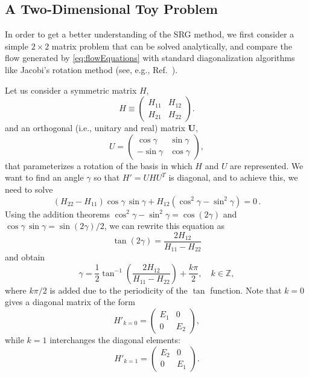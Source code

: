 \subsection{A Two-Dimensional Toy Problem}

In order to get a better understanding of the SRG method, we first consider  
a simple $2\times 2$ matrix problem that can be solved analytically, and 
compare the flow generated by \eqref{eq:flowEquations} with standard 
diagonalization algorithms like Jacobi's rotation method (see, e.g., 
Ref.~\cite{Golub:2013le}).

Let us consider a symmetric matrix $H$, 
\begin{equation} 
  H \equiv \begin{pmatrix} H_{11} & H_{12} \\ H_{21} & H_{22}\end{pmatrix}. 
\end{equation}
and an orthogonal (i.e., unitary and real) matrix $\mathbf{U}$,
\begin{equation}
  U = \begin{pmatrix} \cos\gamma & \sin\gamma \\ -\sin\gamma & \cos\gamma \end{pmatrix}, 
\end{equation}
that parameterizes a rotation of the basis in which $H$ and $U$ are
represented. We want to find an angle $\gamma$ so that $H' = UHU^T$ is diagonal, 
and to achieve this, we need to solve
\begin{equation}
(H_{22} - H_{11})\cos\gamma\,\sin\gamma + H_{12}(\cos^2\gamma - \sin^2\gamma) = 0\,.
\end{equation}
Using the addition theorems $\cos^2\gamma-\sin^2\gamma = \cos(2\gamma)$ and 
$\cos\gamma\,\sin\gamma = \sin(2\gamma)/2$, we can rewrite this equation as
\begin{equation}
  \tan(2\gamma) = \frac{2 H_{12}}{H_{11}-H_{22}}
\end{equation}
and obtain
\begin{equation} 
\gamma = \frac{1}{2} \tan^{-1} \left( \frac{2H_{12}}{H_{11}-H_{22}}
\right) + \frac{k\pi}{2}, \quad k \in \mathbb{Z}, \label{eq:0} 
\end{equation}
where $k\pi/2$ is added due to the periodicity of the $\tan$ function.
Note that  $k=0$ gives a diagonal matrix of the form
\begin{equation} 
H'_{k=0} = \begin{pmatrix} E_1 & 0 \\ 0 & E_2 \end{pmatrix},
\label{eq:1} 
\end{equation}
while  $k=1$ interchanges the diagonal elements:  
\begin{equation} 
H'_{k=1} = \begin{pmatrix} E_2 & 0 \\ 0 & E_1 \end{pmatrix}.
\label{eq:2}
\end{equation}

